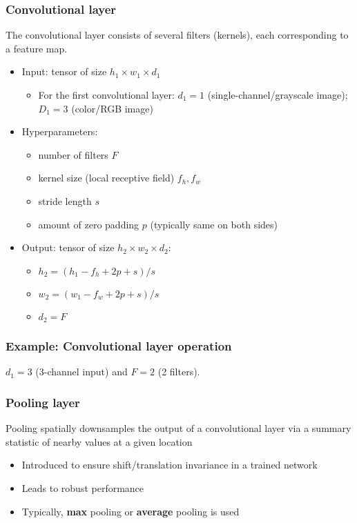 \documentclass[smaller]{beamer}
\begin{document}
\begin{frame}
  \frametitle{Convolutional layer}
  \pause
  The convolutional layer consists of several filters (kernels), each corresponding to a feature map. 

  \begin{itemize}
  \item Input: tensor of size $h_{1}\times w_{1} \times d_{1}$
    \begin{itemize}
    \item For the first convolutional layer: $d_{1} = 1$ (single-channel/grayscale image); $D_{1}=3$ (color/RGB image)
    \end{itemize}
    \pause
  \item Hyperparameters: \pause
    \begin{itemize}
    \item number of filters $F$
    \item kernel size (local receptive field) $f_h, f_w$
    \item stride length $s$
    \item amount of zero padding $p$ (typically same on both sides)
    \end{itemize}
    \pause
  \item Output: tensor of size $h_{2}\times w_{2}\times d_{2}$:\pause
    \begin{itemize}
    \item $h_{2} = (h_{1} - f_h + 2p + s)/s$
    \item $w_{2} = (w_{1} - f_w + 2p + s)/s$
    \item $d_{2} = F$
    \end{itemize}
  \end{itemize}
\end{frame}

\begin{frame}
  \frametitle{Example: Convolutional layer operation}
  \pause
  $d_{1} = 3$ (3-channel input) and $F = 2$ (2 filters). \pause

\end{frame}

\begin{frame}
  \frametitle{Pooling layer}
  \pause
  Pooling spatially downsamples the output of a convolutional layer via a summary statistic of nearby values at a given location
  \pause
  \begin{itemize}
  \item Introduced to ensure shift/translation invariance in a trained network\pause
  \item Leads to robust performance\pause
  \item Typically, \textbf{max} pooling or \textbf{average} pooling is used
  \end{itemize}
  \pause
\end{frame}
\end{document}
